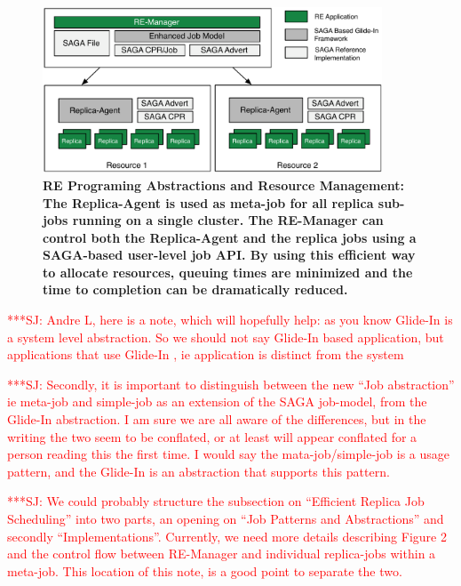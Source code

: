 \documentclass{rspublic}
\newcommand{\jhanote}[1]{ {\textcolor{red} { ***SJ: #1 }}}
\newcommand{\jhanote}[1]{}
\newcommand{\glidein}[1]{Glide-In }
\newcommand{\replicaagent}[1]{Replica-Agent }
\newcommand{\remanager}[1]{RE-Manager }
\begin{document}
\begin{figure}[t]
    \centering
    \includegraphics[width=0.9\textwidth]{remdmanager_v11}
    \caption{\footnotesize \bf RE Programing Abstractions and
      Resource Management: The Replica-Agent is used as meta-job for
      all replica sub-jobs running on a single cluster. The
      \remanager\ can control both the \replicaagent\ and the replica
      jobs using a SAGA-based user-level job API. By using this
      efficient way to allocate resources, queuing times are minimized
      and the time to completion can be dramatically reduced.}
    \label{fig:remdmanager_v1.1}
\end{figure}

\jhanote{Andre L, here is a note, which will hopefully help: as you
  know \glidein\ is a system level abstraction. So we should not say
  \glidein\ based application, but applications that use \glidein\ ,
  ie application is distinct from the system}

\jhanote{Secondly, it is important to distinguish between the new
  ``Job abstraction'' ie meta-job and simple-job as an extension of
  the SAGA job-model, from the \glidein\ abstraction. I am sure we are
  all aware of the differences, but in the writing the two seem to be
  conflated, or at least will appear conflated for a person reading
  this the first time. I would say the mata-job/simple-job is a usage
  pattern, and the \glidein\ is an abstraction that supports this
  pattern.}

\jhanote{We could probably structure the subsection on ``Efficient
  Replica Job Scheduling'' into two parts, an opening on ``Job
  Patterns and Abstractions'' and secondly
  ``Implementations''. Currently, we need more details describing
  Figure 2 and the control flow between \remanager\ and individual
  replica-jobs within a meta-job. This location of this note, is a
  good point to separate the two.}   
  
  
\end{document}
